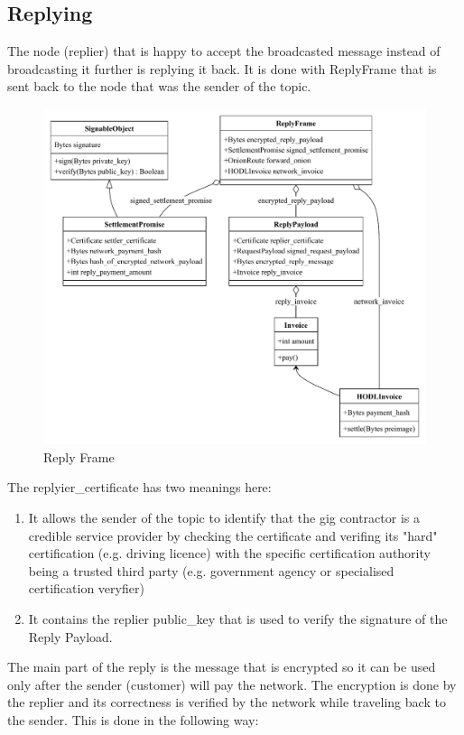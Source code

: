 \documentclass{article}
\begin{document}
\subsection{Replying}
The node (replier) that is happy to accept the broadcasted message instead of broadcasting it further is replying it back. It is done with ReplyFrame that is sent back to the node that was the sender of the topic.

\begin{figure}
	\centering
	\includegraphics[scale=0.7]{ReplyFrame.pdf}
	\caption{Reply Frame}
	\label{fig:fr:replyframe}
\end{figure}

The replyier\_certificate has two meanings here:

\begin{enumerate}
	\item It allows the sender of the topic to identify that the gig contractor is a credible service provider by checking the certificate and verifing its "hard" certification (e.g. driving licence) with the specific certification authority being a trusted third party (e.g. government agency or specialised certification veryfier)
	\item It contains the replier public\_key that is used to verify the signature of the Reply Payload.
\end{enumerate}

The main part of the reply is the message that is encrypted so it can be used only after the sender (customer) will pay the network. The encryption is done by the replier and its correctness is verified by the network while traveling back to the sender. This is done in the following way:
\end{document}

